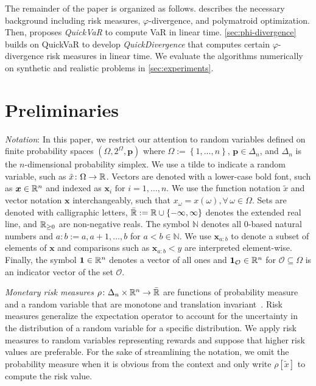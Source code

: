 \documentclass[10pt]{article} %
\newcommand{\Nats}{\mathbb{N}}
\renewcommand{\cite}{\citep}
\begin{document}
The remainder of the paper is organized as follows.  describes the necessary background including risk measures, $\varphi$-divergence, and polymatroid optimization. Then,  proposes \emph{QuickVaR} to compute VaR in linear time. \cref{sec:phi-divergence} builds on QuickVaR to develop \emph{QuickDivergence} that computes certain $\varphi$-divergence risk measures in linear time. We evaluate the algorithms numerically on synthetic and realistic problems in \cref{sec:experiments}.

\section{Preliminaries}\label{sec:preliminaries}

\emph{Notation}: In this paper, we restrict our attention to random variables defined on finite probability spaces $(\Omega, 2^{\Omega}, \bm{p})$ where $\Omega := \left\{ 1, \dots , n \right\}$, $\bm{p} \in \Delta_n$, and $\Delta_n$ is the $n$-dimensional probability simplex. We use a tilde to indicate a random variable, such as $\tilde{x}\colon \Omega \to \mathbb{R}$. Vectors are denoted with a lower-case bold font, such as $\bm{x} \in \mathbb{R}^n$ and indexed as $\bm{x}_i \text{ for } i = 1, \dots , n$. We use the function notation $\tilde{x}$ and vector notation $\bm{x}$ interchangeably, such that $x_\omega = x(\omega), \forall \,  \omega \in \Omega$. Sets are denoted with calligraphic letters, $\bar{\mathbb{R}} := \mathbb{R} \cup \left\{ -\infty, \infty \right\}$ denotes the extended real line, and $\mathbb{R}_{\ge 0}$ are non-negative reals. The symbol $\Nats$ denotes all 0-based natural numbers and $a{:}b := a, a+1, \dots , b$ for $a < b \in \mathbb{N}$. We use $\bm{x}_{a{:}b}$ to denote a subset of elements of $\bm{x}$ and comparisons such as $\bm{x}_{a{:}b} < y$ are interpreted element-wise. Finally, the symbol $\bm{1} \in \mathbb{R}^n$ denotes a vector of all ones and $\bm{1}_{\mathcal{O}} \in \mathbb{R}^n$ for $\mathcal{O} \subseteq \Omega$ is an indicator vector of the set $\mathcal{O}$.

\emph{Monetary risk measures} $\rho\colon \Delta_n \times \mathbb{R}^n \to \bar{\mathbb{R}}$ are functions of probability measure and a random variable that are monotone and translation invariant~\cite{Follmer2016}. Risk measures generalize the expectation operator to account for the uncertainty in the distribution of a random variable for a specific distribution. We apply risk measures to random variables representing rewards and suppose that higher risk values are preferable. For the sake of streamlining the notation, we omit the probability measure when it is obvious from the context and only write $\rho[\tilde{x}]$ to compute the risk value.
\end{document}
